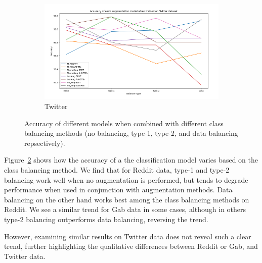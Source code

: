 \documentclass[11pt,a4paper]{article}
\begin{document}
\begin{figure}
    \begin{subfigure}{1.5\columnwidth}
        \includegraphics[width=\columnwidth]{figs/Twitter.png}
        \caption{Twitter}
        \label{fig:twitterbal}
    \end{subfigure}
    \caption{Accuracy of different models when combined with different class balancing methods (no balancing, type-1, type-2, and data balancing repsectively).}
    \label{fig:bal}
\end{figure}

Figure~\ref{fig:bal} shows how the accuracy of a the classification model varies based on the class balancing method. We find that for Reddit data, type-1 and type-2 balancing work well when no augmentation is performed, but tends to degrade performance when used in conjunction with augmentation methods. Data balancing on the other hand works best among the class balancing methods on Reddit. We see a similar trend for Gab data in some cases, although in others type-2 balancing outperforms data balancing, reversing the trend. 

However, examining similar results on Twitter data does not reveal such a clear trend, further highlighting the qualitative differences between Reddit or Gab, and Twitter data.




\appendix
\end{document}
